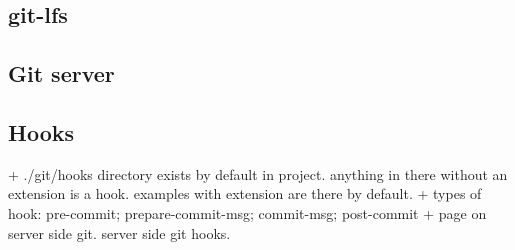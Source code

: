 \subsection{git-lfs}
\subsection{Git server}
\subsection{Hooks}


+ ./git/hooks directory exists by default in project. anything in there without an extension is a hook. examples with  extension are there by default.
+ types of hook: pre-commit; prepare-commit-msg; commit-msg; post-commit
+ page on server side git. server side git hooks.
